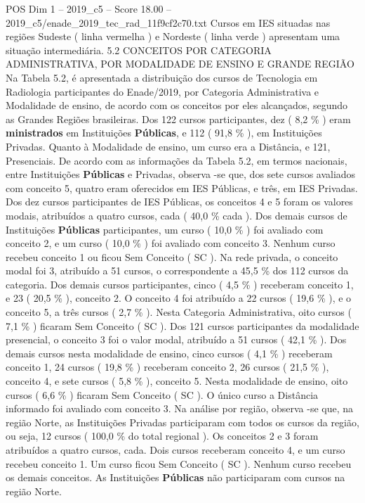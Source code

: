 \begin{textsample}{POS Dim 1 – 2019\_c5 – Score 18.00 – 2019\_c5/enade\_2019\_tec\_rad\_11f9cf2c70.txt}
Cursos em IES situadas nas regiões Sudeste ( linha vermelha ) e Nordeste ( linha verde ) apresentam uma situação intermediária. 5.2 CONCEITOS POR CATEGORIA ADMINISTRATIVA, POR MODALIDADE DE ENSINO E GRANDE REGIÃO Na Tabela 5.2, é apresentada a distribuição dos cursos de Tecnologia em Radiologia participantes do Enade/2019, por Categoria Administrativa e Modalidade de ensino, de acordo com os conceitos por eles alcançados, segundo as Grandes Regiões brasileiras.
Dos 122 cursos participantes, dez ( 8,2 \% ) eram \textbf{ministrados} em Instituições \textbf{Públicas}, e 112 ( 91,8 \% ), em Instituições Privadas.
Quanto à Modalidade de ensino, um curso era a Distância, e 121, Presenciais.
De acordo com as informações da Tabela 5.2, em termos nacionais, entre Instituições \textbf{Públicas} e Privadas, observa -se que, dos sete cursos avaliados com conceito 5, quatro eram oferecidos em IES Públicas, e três, em IES Privadas.
Dos dez cursos participantes de IES Públicas, os conceitos 4 e 5 foram os valores modais, atribuídos a quatro cursos, cada ( 40,0 \% cada ).
Dos demais cursos de Instituições \textbf{Públicas} participantes, um curso ( 10,0 \% ) foi avaliado com conceito 2, e um curso ( 10,0 \% ) foi avaliado com conceito 3.
Nenhum curso recebeu conceito 1 ou ficou Sem Conceito ( SC ).
Na rede privada, o conceito modal foi 3, atribuído a 51 cursos, o correspondente a 45,5 \% dos 112 cursos da categoria.
Dos demais cursos participantes, cinco ( 4,5 \% ) receberam conceito 1, e 23 ( 20,5 \% ), conceito 2.
O conceito 4 foi atribuído a 22 cursos ( 19,6 \% ), e o conceito 5, a três cursos ( 2,7 \% ).
Nesta Categoria Administrativa, oito cursos ( 7,1 \% ) ficaram Sem Conceito ( SC ).
Dos 121 cursos participantes da modalidade presencial, o conceito 3 foi o valor modal, atribuído a 51 cursos ( 42,1 \% ).
Dos demais cursos nesta modalidade de ensino, cinco cursos ( 4,1 \% ) receberam conceito 1, 24 cursos ( 19,8 \% ) receberam conceito 2, 26 cursos ( 21,5 \% ), conceito 4, e sete cursos ( 5,8 \% ), conceito 5.
Nesta modalidade de ensino, oito cursos ( 6,6 \% ) ficaram Sem Conceito ( SC ).
O único curso a Distância informado foi avaliado com conceito 3.
Na análise por região, observa -se que, na região Norte, as Instituições Privadas participaram com todos os cursos da região, ou seja, 12 cursos ( 100,0 \% do total regional ).
Os conceitos 2 e 3 foram atribuídos a quatro cursos, cada.
Dois cursos receberam conceito 4, e um curso recebeu conceito 1.
Um curso ficou Sem Conceito ( SC ).
Nenhum curso recebeu os demais conceitos.
As Instituições \textbf{Públicas} não participaram com cursos na região Norte.

\end{textsample}
